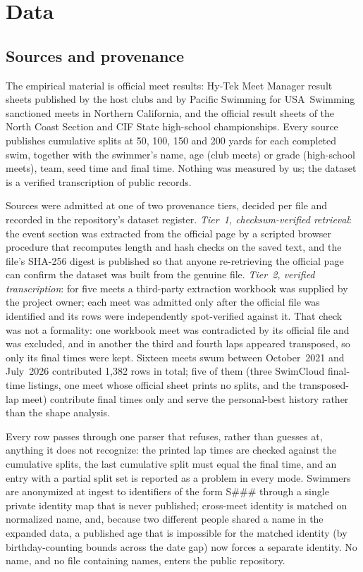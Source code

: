 \section{Data}\label{sec:data}

\subsection{Sources and provenance}

The empirical material is official meet results: Hy-Tek Meet Manager
result sheets published by the host clubs and by Pacific Swimming for
USA~Swimming sanctioned meets in Northern California, and the official
result sheets of the North Coast Section and CIF State high-school
championships. Every source publishes cumulative splits at 50, 100, 150 and
200 yards for each completed swim, together with the swimmer's name, age
(club meets) or grade (high-school meets), team, seed time and final time.
Nothing was measured by us; the dataset is a verified transcription of
public records.

Sources were admitted at one of two provenance tiers, decided per file and
recorded in the repository's dataset register. \emph{Tier~1, checksum-verified
retrieval}: the event section was extracted from the official page by a
scripted browser procedure that recomputes length and hash checks on the
saved text, and the file's SHA-256 digest is published so that anyone
re-retrieving the official page can confirm the dataset was built from the
genuine file. \emph{Tier~2, verified transcription}: for five meets a
third-party extraction workbook was supplied by the project owner; each meet
was admitted only after the official file was identified and its rows were
independently spot-verified against it. That check was not a formality: one
workbook meet was contradicted by its official file and was excluded, and in
another the third and fourth laps appeared transposed, so only its final
times were kept. Sixteen meets swum between October~2021 and July~2026
contributed 1{,}382 rows in total; five of them (three SwimCloud final-time
listings, one meet whose official sheet prints no splits, and the
transposed-lap meet) contribute final times only and serve the personal-best
history rather than the shape analysis.

Every row passes through one parser that refuses, rather than guesses at,
anything it does not recognize: the printed lap times are checked against
the cumulative splits, the last cumulative split must equal the final time,
and an entry with a partial split set is reported as a problem in every
mode. Swimmers are anonymized at ingest to identifiers of the form S\#\#\#
through a single private identity map that is never published; cross-meet
identity is matched on normalized name, and, because two different people
shared a name in the expanded data, a published age that is impossible for
the matched identity (by birthday-counting bounds across the date gap) now
forces a separate identity. No name, and no file containing names, enters
the public repository.

